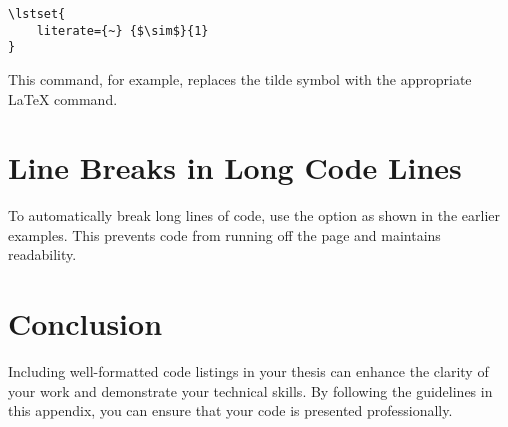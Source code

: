 			\begin{lstlisting}[style=LaTeXStyle]
\lstset{
	literate={~} {$\sim$}{1}
}
			\end{lstlisting}

			This command, for example, replaces the tilde symbol with the appropriate LaTeX command.


	\section{Line Breaks in Long Code Lines}

		To automatically break long lines of code, use the  option as shown in the earlier examples. 
		This prevents code from running off the page and maintains readability.

	\section{Conclusion}

		Including well-formatted code listings in your thesis can enhance the clarity of your work and demonstrate your technical skills. 
		By following the guidelines in this appendix, you can ensure that your code is presented professionally.

